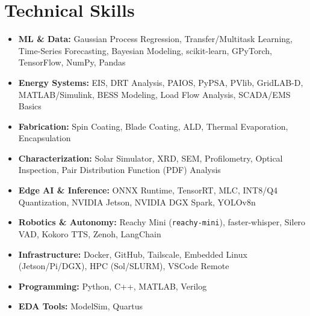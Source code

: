 \documentclass[10pt, letterpaper]{article}
\begin{document}
\section*{Technical Skills}

\begin{itemize}
  \item \textbf{ML \& Data:} Gaussian Process Regression, Transfer/Multitask Learning,
    Time-Series Forecasting, Bayesian Modeling, scikit-learn, GPyTorch, TensorFlow, NumPy, Pandas
  \item \textbf{Energy Systems:} EIS, DRT Analysis, PAIOS, PyPSA, PVlib, GridLAB-D,
    MATLAB/Simulink, BESS Modeling, Load Flow Analysis, SCADA/EMS Basics
  \item \textbf{Fabrication:} Spin Coating, Blade Coating, ALD, Thermal Evaporation,
    Encapsulation
  \item \textbf{Characterization:} Solar Simulator, XRD, SEM, Profilometry, Optical Inspection,
    Pair Distribution Function (PDF) Analysis
  \item \textbf{Edge AI \& Inference:} ONNX Runtime, TensorRT, MLC, INT8/Q4 Quantization,
    NVIDIA Jetson, NVIDIA DGX Spark, YOLOv8n
  \item \textbf{Robotics \& Autonomy:} Reachy Mini (\texttt{reachy-mini}), faster-whisper,
    Silero VAD, Kokoro TTS, Zenoh, LangChain
  \item \textbf{Infrastructure:} Docker, GitHub, Tailscale, Embedded Linux (Jetson/Pi/DGX),
    HPC (Sol/SLURM), VSCode Remote
  \item \textbf{Programming:} Python, C++, MATLAB, Verilog
  \item \textbf{EDA Tools:} ModelSim, Quartus
\end{itemize}
\end{document}
